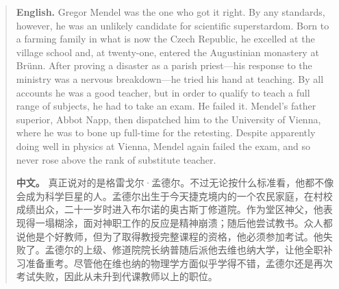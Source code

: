 \begin{quote}
\noindent\textbf{English.} Gregor Mendel was the one who got it right. By any standards, however, he was an unlikely candidate for scientific superstardom. Born to a farming family in what is now the Czech Republic, he excelled at the village school and, at twenty-one, entered the Augustinian monastery at Brünn. After proving a disaster as a parish priest---his response to the ministry was a nervous breakdown---he tried his hand at teaching. By all accounts he was a good teacher, but in order to qualify to teach a full range of subjects, he had to take an exam. He failed it. Mendel's father superior, Abbot Napp, then dispatched him to the University of Vienna, where he was to bone up full-time for the retesting. Despite apparently doing well in physics at Vienna, Mendel again failed the exam, and so never rose above the rank of substitute teacher.

\smallskip
\noindent\textbf{中文。} 真正说对的是格雷戈尔·孟德尔。不过无论按什么标准看，他都不像会成为科学巨星的人。孟德尔出生于今天捷克境内的一个农民家庭，在村校成绩出众，二十一岁时进入布尔诺的奥古斯丁修道院。作为堂区神父，他表现得一塌糊涂，面对神职工作的反应是精神崩溃；随后他尝试教书。众人都说他是个好教师，但为了取得教授完整课程的资格，他必须参加考试。他失败了。孟德尔的上级、修道院院长纳普随后派他去维也纳大学，让他全职补习准备重考。尽管他在维也纳的物理学方面似乎学得不错，孟德尔还是再次考试失败，因此从未升到代课教师以上的职位。
\end{quote}

